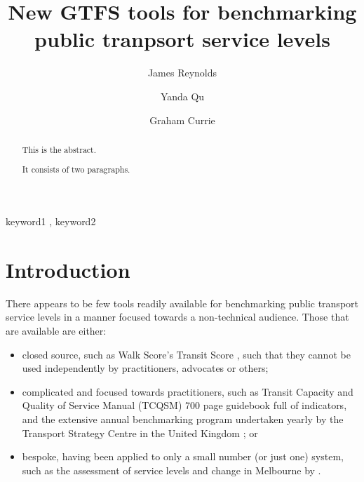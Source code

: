 \documentclass[preprint, 3p,
authoryear]{elsarticle} %
\begin{document}
\begin{frontmatter}

  \title{New GTFS tools for benchmarking public tranpsort service
levels}
    \author[Public Transport Research Group (PTRG)]{James Reynolds%
  }
    \author[Public Transport Research Group (PTRG)]{Yanda Qu%
  }
    \author[Public Transport Research Group (PTRG)]{Graham Currie%
  }
  
  \begin{abstract}
  This is the abstract.

  It consists of two paragraphs.
  \end{abstract}
    \begin{keyword}
    keyword1 \sep 
    keyword2
  \end{keyword}
  
 \end{frontmatter}

\hypertarget{introduction}{%
\section{Introduction}\label{introduction}}

There appears to be few tools readily available for benchmarking public
transport service levels in a manner focused towards a non-technical
audience. Those that are available are either:

\begin{itemize}
\item
  closed source, such as Walk Score's Transit Score
  \citep{WalkScore:2023tg}, such that they cannot be used independently
  by practitioners, advocates or others;
\item
  complicated and focused towards practitioners, such as Transit
  Capacity and Quality of Service Manual (TCQSM)\citep{TCQSM:2013} 700
  page guidebook full of indicators, and the extensive annual
  benchmarking program undertaken yearly by the Transport Strategy
  Centre in the United Kingdom \citep{Imperial-College-London:2023aa};
  or
\item
  bespoke, having been applied to only a small number (or just one)
  system, such as the assessment of service levels and change in
  Melbourne by \citet{Currie2016BoldIdeas}.
\end{itemize}
\end{document}
